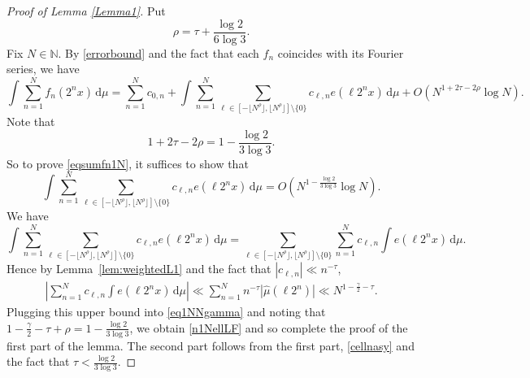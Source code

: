 \documentclass[10pt,a4paper]{amsart}
\numberwithin{equation}{section} %
\begin{document}
\begin{proof}[Proof of Lemma \ref{Lemma1}] 
Put
	\begin{equation*}
\rho=\tau+\frac{\log2}{6\log3}.
	\end{equation*}
	Fix $N\in\mathbb{N}$. By \eqref{errorbound} and the fact that each $f_n$ coincides with its Fourier series, we have  $$\int \sum_{n=1}^{N}f_{n}(2^nx)\, \mathrm{d}\mu = \sum_{n=1}^{N}c_{0,n}+\int \sum_{n=1}^{N}\sum_{\ell\in [-\lfloor N^{ \rho}\rfloor ,\lfloor N^{\rho}\rfloor]\setminus \{0\}}c_{\ell,n}e(\ell 2^nx)\, \mathrm{d}\mu+O\left(N^{1+2\tau-2\rho}\log N\right).$$
	Note that 
	\[1+2\tau-2\rho=1-\frac{\log2}{3\log3}.\]
	So to prove \eqref{eqsumfn1N}, it suffices to show that
	\begin{equation}
		\label{n1NellLF}
		\int \sum_{n=1}^{N}\sum_{\ell\in [-\lfloor N^{\rho}\rfloor ,\lfloor N^{\rho}\rfloor]\setminus \{0\}}c_{\ell,n}e(\ell2^nx)\, \mathrm{d}\mu=O\left(N^{1-\frac{\log2}{3\log3}}\log N\right).
	\end{equation}
	We have 
	\begin{equation}\label{eq1NNgamma}
		\int \sum_{n=1}^{N}\sum_{\ell\in [-\lfloor N^{\rho}\rfloor,\lfloor N^{\rho }\rfloor]\setminus \{0\}}c_{\ell,n}e(\ell 2^nx)\, \mathrm{d}\mu=\sum_{\ell\in [-\lfloor N^{ \rho}\rfloor,\lfloor N^{ \rho}\rfloor]\setminus \{0\}}\sum_{n=1}^{N}c_{\ell,n}\int e(\ell 2^nx)\, \mathrm{d}\mu.
	\end{equation} 
     Hence by Lemma~\ref{lem:weightedL1} and the fact that $|c_{\ell,n}|\ll n^{-\tau}$, 
	\begin{align*}
		\left|\sum_{n=1}^{N}c_{\ell,n}\int e(\ell 2^nx)\, \mathrm{d}\mu\right|\ll \sum_{n=1}^{N }n^{-\tau}|\widehat{\mu}(\ell 2^n)|
		\ll N^{1-\frac{\gamma}{2}-\tau}.
	\end{align*}
Plugging this upper bound into \eqref{eq1NNgamma} and noting that $1-\frac{\gamma}{2}-\tau+\rho=1-\frac{\log2}{3\log3}$, we obtain  \eqref{n1NellLF} and so complete the proof of the first part of the lemma. The second part follows from the first part, \eqref{cellnasy} and the fact that $\tau <\frac{\log2}{3\log3}$.  
\end{proof}


 
\end{document}
